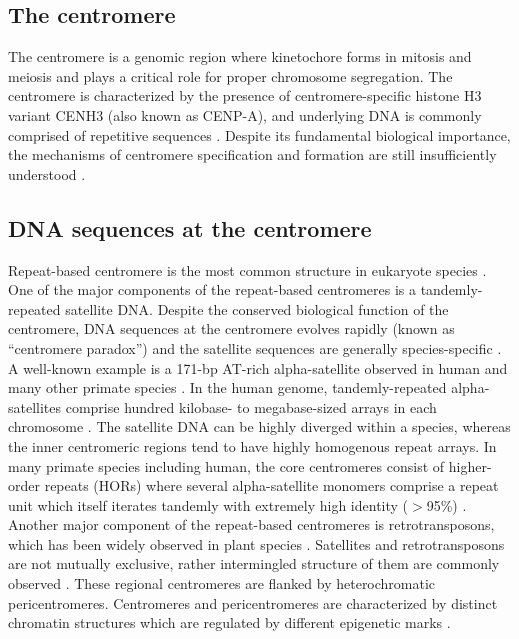 \subsection*{The centromere}
  The centromere is a genomic region where kinetochore forms in mitosis and meiosis and plays a critical role for proper chromosome segregation.  The centromere is characterized by the presence of centromere-specific histone H3 variant CENH3 (also known as CENP-A), and underlying DNA is commonly comprised of repetitive sequences \cite{Plohl2014}. Despite its fundamental biological importance, the mechanisms of centromere specification and formation are still insufficiently understood \cite{McKinley2016}.


\subsection*{DNA sequences at the centromere}
  Repeat-based centromere is the most common structure in eukaryote species \cite{Plohl2014}. One of the major components of the repeat-based centromeres is a tandemly-repeated satellite DNA. Despite the conserved biological function of the centromere, DNA sequences at the centromere evolves rapidly (known as ``centromere paradox'') and the satellite sequences are generally species-specific \cite{Henikoff2001}. A well-known example is a 171-bp AT-rich alpha-satellite observed in human and many other primate species \cite{Willard1991}. In the human genome, tandemly-repeated alpha-satellites comprise hundred kilobase- to megabase-sized arrays in each chromosome \cite{Willard1987}. The satellite DNA can be highly diverged within a species, whereas the inner centromeric regions tend to have highly homogenous repeat arrays. In many primate species including human, the core centromeres consist of higher-order repeats (HORs) where several alpha-satellite monomers comprise a repeat unit which itself iterates tandemly with extremely high identity ($>$95\%) \cite{Willard1987}. Another major component of the repeat-based centromeres is retrotransposons, which has been widely observed in plant species \cite{Wang2009, Lermontova2015}. Satellites and retrotransposons are not mutually exclusive, rather intermingled structure of them are commonly observed \cite{Plohl2014}. These regional centromeres are flanked by heterochromatic pericentromeres. Centromeres and pericentromeres are characterized by distinct chromatin structures which are regulated by different epigenetic marks \cite{Verdaasdonk2011, McKinley2016}.


